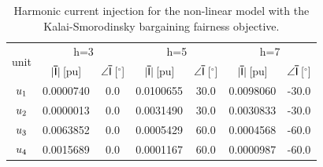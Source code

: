 \begin{table}[b!]
    \centering
    \caption{Harmonic current injection for the non-linear model with the Kalai-Smorodinsky bargaining fairness objective.}
    \label{tab:unit_currents}
    \begin{tabular}{c | c c c c c c}
        \multirow{2}{*}{unit}   & \multicolumn{2}{c}{h=3}                                           & \multicolumn{2}{c}{h=5}                       & \multicolumn{2}{c}{h=7}                       \\ 
                                & $|\mathsf{\bar{I}}|$\,[pu] & $\angle\mathsf{\bar{I}}$\,[$^{\circ}$] & $|\mathsf{\bar{I}}|$\,[pu] & $\angle\mathsf{\bar{I}}$\,[$^{\circ}$] & $|\mathsf{\bar{I}}|$\,[pu] & $\angle\mathsf{\bar{I}}$\,[$^{\circ}$] \\ \hline
        $u_{1}$             & 0.0000740                & 0.0                        & 0.0100655                      & 30.0                 & 0.0098060       & -30.0                      \\
        $u_{2}$             & 0.0000013                & 0.0                        & 0.0031490                      & 30.0                 & 0.0030833       & -30.0                      \\
        $u_{3}$             & 0.0063852                & 0.0                        & 0.0005429                      & 60.0                 & 0.0004568       & -60.0                      \\
        $u_{4}$             & 0.0015689                & 0.0                        & 0.0001167                      & 60.0                 & 0.0000987       & -60.0                      \\
    \end{tabular}
\end{table}

